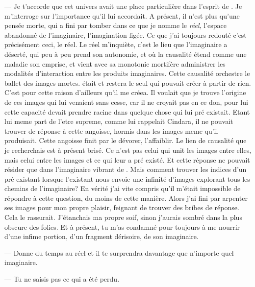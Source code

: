--- Je t'accorde que cet univers avait une place particulière dans l'esprit de \Mey. Je m'interroge sur l'importance qu'il lui accordait. A présent, il n'est plus qu'une pensée morte, qui a fini par tomber dans ce que je nomme le \textit{réel}, l'espace abandonné de l'imaginaire, l'imagination figée.  Ce que j'ai toujours redouté c'est précisément ceci, le réel. Le réel m'inquiète, c'est le lieu que l'imaginaire a déserté, qui peu à peu prend son autonomie, et où la causalité étend comme une maladie son emprise, et vient avec sa monotonie mortifère administrer les modalités d'interaction entre les produits imaginaires. Cette causalité orchestre le ballet des images mortes. \Mey était et restera le seul qui pouvait créer à partir de rien. C'est pour cette raison d'ailleurs qu'il me créea. Il voulait que je trouve l'origine de ces images qui lui venaient sans cesse, car il ne croyait pas en ce don, pour lui cette capacité devait prendre racine dans quelque chose qui lui pré existait. Etant lui meme part de l'etre supreme, comme lui rappelait Cindara, il ne pouvait trouver de réponse à cette angoisse, hormis dans les images meme qu'il produisait. Cette angoisse finit par le dévorer, l'affaiblir.   Le lien de causalité que je recherchais est à présent brisé. Ce n'est pas celui qui unit les images entre elles, mais celui entre les images et ce qui leur a pré existé. Et cette réponse ne pouvait résider que dans l'imaginaire vibrant de \Mey. Mais comment trouver les indices d'un pré existant lorsque l'existant nous envoie une infinité d'images explorant tous les chemins de l'imaginaire? En vérité j'ai vite compris qu'il m'était impossible de répondre à cette question, du moins de cette manière. Alors j'ai fini par arpenter ses images pour mon propre plaisir, feignant de trouver des bribes de réponse. Cela le rassurait. J'étanchais ma propre soif, sinon j'aurais sombré dans la plus obscure des folies. Et à présent, tu m'as condamné  pour toujours  à me nourrir d'une infime portion, d'un fragment dérisoire, de son imaginaire.


--- Donne du temps au réel et il te surprendra davantage que n'importe quel imaginaire.

--- Tu ne saisis pas ce qui a été perdu. 

